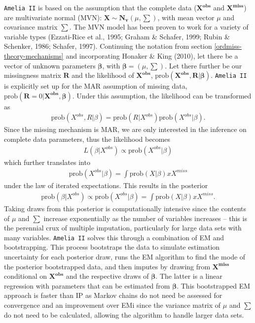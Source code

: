 \documentclass[12pt,econ]{sources/authesis}
\begin{document}
\texttt{Amelia\ II} is based on the assumption that the complete data (\(\bm{X^{obs}}\) and \(\bm{X^{miss}}\)) are multivariate normal (MVN): \(\bm{X} \sim \bm{N_v}(\mu, \sum)\), with mean vector \(\mu\) and covariance matrix \(\sum\). The MVN model has been proven to work for a variety of variable types (Ezzati-Rice et al., 1995; Graham \& Schafer, 1999; Rubin \& Schenker, 1986; Schafer, 1997). Continuing the notation from section \ref{ordmiss-theory-mechanisms} and incorporating Honaker \& King (2010), let there be a vector of unknown parameters \(\bm{\beta}\), with \(\bm{\beta} = (\mu, \sum)\). Let there further be our missingness matrix \(\bm{R}\) and the likelihood of \(\bm{X^{obs}}\), \(\text{prob}(\bm{X^{obs}}, \bm{R} | \bm{\beta})\). \texttt{Amelia\ II} is explicitly set up for the MAR assumption of missing data, \(\text{prob}(\bm{R} = 0 | \bm{X^{obs}}, \bm{\beta})\). Under this assumption, the likelihood can be transformed as
\begin{align}
\text{prob}(X^{obs}, R | \beta) = \text{prob}(R | X^{obs}) \text{prob}(X^{obs} | \beta).
\end{align}
Since the missing mechanism is MAR, we are only interested in the inference on complete data parameters, thus the likelihood becomes
\begin{align}
L(\beta | X^{obs}) \propto \text{prob}(X^{obs} | \beta)
\end{align}
which further translates into
\begin{align}
\text{prob}(X^{obs} | \beta) = \int \text{prob}(X | \beta) x X^{miss}
\end{align}
under the law of iterated expectations. This results in the posterior
\begin{align}
\text{prob}(\beta | X^{obs}) \propto \text{prob}(X^{obs} | \beta) = \int \text{prob}(X | \beta) x X^{miss}.
\end{align}
Taking draws from this posterior is computationally intensive since the contents of \(\mu\) and \(\sum\) increase exponentially as the number of variables increases -- this is the perennial crux of multiple imputation, particularly for large data sets with many variables. \texttt{Amelia\ II} solves this through a combination of EM and bootstrapping. This process bootstraps the data to simulate estimation uncertainty for each posterior draw, runs the EM algorithm to find the mode of the posterior bootstrapped data, and then imputes by drawing from \(\bm{X^{miss}}\) conditional on \(\bm{X^{obs}}\) and the respective draws of \(\bm{\beta}\). The latter is a linear regression with parameters that can be estimated from \(\bm{\beta}\). This bootstrapped EM approach is faster than IP as Markov chains do not need be assessed for convergence and an improvement over EMi since the variance matrix of \(\mu\) and \(\sum\) do not need to be calculated, allowing the algorithm to handle larger data sets.
\end{document}
